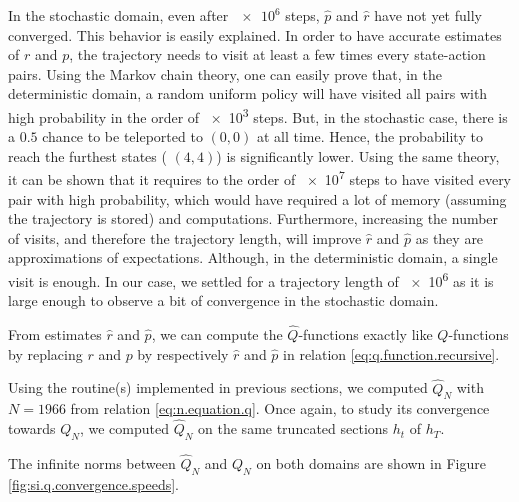 \documentclass[a4paper, 12pt]{article}
\begin{document}
    In the stochastic domain, even after $\num{e6}$ steps, $\hat{p}$ and $\hat{r}$ have not yet fully converged. This behavior is easily explained. In order to have accurate estimates of $r$ and $p$, the trajectory needs to visit at least a few times every state-action pairs. Using the Markov chain theory, one can easily prove that, in the deterministic domain, a random uniform policy will have visited all pairs with high probability in the order of \num{e3} steps. But, in the stochastic case, there is a $0.5$ chance to be teleported to $(0, 0)$ at all time. Hence, the probability to reach the furthest states (\eg{} $(4, 4)$) is significantly lower. Using the same theory, it can be shown that it requires to the order of \num{e7} steps to have visited every pair with high probability, which would have required a lot of memory (assuming the trajectory is stored) and computations. Furthermore, increasing the number of visits, and therefore the trajectory length, will improve $\hat{r}$ and $\hat{p}$ as they are approximations of expectations. Although, in the deterministic domain, a single visit is enough. In our case, we settled for a trajectory length of \num{e6} as it is large enough to observe a bit of convergence in the stochastic domain.
    
    From estimates $\hat{r}$ and $\hat{p}$, we can compute the $\hat{Q}$-functions exactly like $Q$-functions by replacing $r$ and $p$ by respectively $\hat{r}$ and $\hat{p}$ in relation \eqref{eq:q.function.recursive}.
    
    Using the routine(s) implemented in previous sections, we computed $\hat{Q}_N$ with $N = \num{1966}$ from relation \eqref{eq:n.equation.q}. Once again, to study its convergence towards $Q_N$, we computed $\hat{Q}_N$ on the same truncated sections $h_t$ of $h_T$.
    
    The infinite norms between $\hat{Q}_N$ and $Q_N$ on both domains are shown in Figure \ref{fig:si.q.convergence.speeds}.
    
\end{document}
